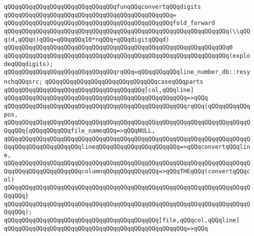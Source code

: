 \verb|qQQqqQQqqQQqqQQqqQQqqQQqqQQqqQQqfunqQQqconvertqQQqdigits|\newline
\verb|qQQqqQQqqQQqqQQqqQQqqQQqqQQqqQQqqQQqqQQqqQQqqQQq=|\newline
\verb|qQQqqQQqqQQqqQQqqQQqqQQqqQQqqQQqqQQqqQQqqQQqqQQqfold_forward|\newline
\verb|qQQqqQQqqQQqqQQqqQQqqQQqqQQqqQQqqQQqqQQqqQQqqQQqqQQqqQQqqQQqqQQq(\\qQQq(d,qQQqn)qQQq=qQQqqQQq10*nqQQq+qQQqdigitqQQqd)|\newline
\verb|qQQqqQQqqQQqqQQqqQQqqQQqqQQqqQQqqQQqqQQqqQQqqQQqqQQqqQQqqQQqqQQq0|\newline
\verb|qQQqqQQqqQQqqQQqqQQqqQQqqQQqqQQqqQQqqQQqqQQqqQQqqQQqqQQqqQQqqQQq(explodeqQQqdigits);|\newline
\newline
\verb|qQQqqQQqqQQqqQQqqQQqqQQqqQQqqQQqrqQQq=qQQqqQQqqQQqline_number_db::resynchqQQqsrc;|\newline
\newline
\verb|qQQqqQQqqQQqqQQqqQQqqQQqqQQqqQQqcaseqQQqparts|\newline
\newline
\verb|qQQqqQQqqQQqqQQqqQQqqQQqqQQqqQQqqQQqqQQq[col,qQQqline]|\newline
\verb|qQQqqQQqqQQqqQQqqQQqqQQqqQQqqQQqqQQqqQQqqQQqqQQqqQQq=>qQQq|\newline
\verb|qQQqqQQqqQQqqQQqqQQqqQQqqQQqqQQqqQQqqQQqqQQqqQQqqQQqrqQQq(qQQqqQQqqQQqpos,|\newline
\verb|qQQqqQQqqQQqqQQqqQQqqQQqqQQqqQQqqQQqqQQqqQQqqQQqqQQqqQQqqQQqqQQqqQQqqQQqqQQq{qQQqqQQqqQQqfile_nameqQQq=>qQQqNULL,|\newline
\verb|qQQqqQQqqQQqqQQqqQQqqQQqqQQqqQQqqQQqqQQqqQQqqQQqqQQqqQQqqQQqqQQqqQQqqQQqqQQqqQQqqQQqqQQqqQQqlineqQQqqQQqqQQqqQQqqQQqqQQq=>qQQqconvertqQQqline,|\newline
\verb|qQQqqQQqqQQqqQQqqQQqqQQqqQQqqQQqqQQqqQQqqQQqqQQqqQQqqQQqqQQqqQQqqQQqqQQqqQQqqQQqqQQqqQQqqQQqcolumnqQQqqQQqqQQqqQQq=>qQQqTHEqQQq(convertqQQqcol)|\newline
\verb|qQQqqQQqqQQqqQQqqQQqqQQqqQQqqQQqqQQqqQQqqQQqqQQqqQQqqQQqqQQqqQQqqQQqqQQqqQQq}|\newline
\verb|qQQqqQQqqQQqqQQqqQQqqQQqqQQqqQQqqQQqqQQqqQQqqQQqqQQqqQQqqQQqqQQqqQQqqQQqqQQq);|\newline
\newline
\verb|qQQqqQQqqQQqqQQqqQQqqQQqqQQqqQQqqQQqqQQqqQQq[file,qQQqcol,qQQqline]|\newline
\verb|qQQqqQQqqQQqqQQqqQQqqQQqqQQqqQQqqQQqqQQqqQQqqQQqqQQq=>qQQq|\newline
